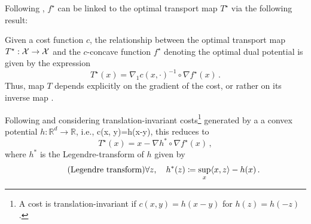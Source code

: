 Following \citet{gangbo1996geometry}, $f^\star$ can be linked to the optimal transport map $T^\star$ via the following result:
\begin{theorem} \label{thm:gangbo-mccann}
	Given a cost function $c$, the relationship between the optimal transport map $T^\star : {\mathcal{X}} \rightarrow {\mathcal{X}}$ and the $c$-concave function $f^\star$ denoting the optimal dual potential is given by the expression 
	\begin{equation}
		T^{\star}(x)=\nabla_1 c(x, \cdot)^{-1} \circ \nabla f^{\star}(x)\,.
	\end{equation}
	Thus, map $T$ depends explicitly on the gradient of the cost, or rather on its inverse map \citep{gangbo1995optimal}. 
	
	Following \citet{gangbo1996geometry} and considering translation-invariant costs\footnote{A cost is translation-invariant if $c(x,y) = h(x-y)$ for $h(z) = h(-z)$.} generated by a a convex potential $h: \mathbb{R}^d \rightarrow \mathbb{R}$, i.e., c(x, y)=h(x-y), this reduces to
	\begin{equation} \label{eq:gangbo_h}
		T^{\star}(x)=x-\nabla h^* \circ \nabla f^{\star}(x)\,,
	\end{equation}
	where $h^*$ is the Legendre-transform of $h$ given by
	\begin{equation} \label{eq:legendre}
		\tag{Legendre transform}
		\forall z, \quad h^*(z) \coloneqq \sup _x \langle x, z\rangle-h(x)\,.
	\end{equation}

\end{theorem}

